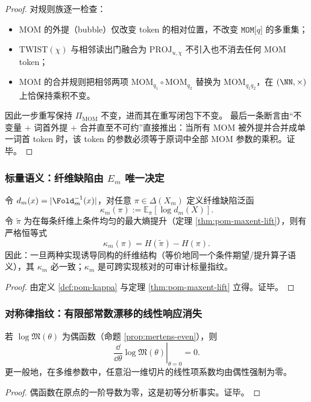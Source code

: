 \begin{proof}
对规则族逐一检查：
\begin{itemize}
  \item \(\mathrm{MOM}\) 的外提（bubble）仅改变 token 的相对位置，不改变 \(\texttt{MOM[}q\texttt{]}\) 的多重集；
  \item \(\mathrm{TWIST}(\chi)\) 与相邻读出门融合为 \(\mathrm{PROJ}_{u,\chi}\) 不引入也不消去任何 \(\mathrm{MOM}\) token；
  \item \(\mathrm{MOM}\) 的合并规则把相邻两项 \(\mathrm{MOM}_{q_1}\circ\mathrm{MOM}_{q_2}\) 替换为 \(\mathrm{MOM}_{q_1q_2}\)，在 \((\NN,\times)\) 上恰保持乘积不变。
\end{itemize}
因此一步重写保持 \(\Pi_{\mathrm{MOM}}\) 不变，进而其在重写闭包下不变。
最后一条断言由“不变量 + 词首外提 + 合并直至不可约”直接推出：当所有 \(\mathrm{MOM}\) 被外提并合并成单一词首 token 时，该 token 的参数必须等于原词中全部 MOM 参数的乘积。证毕。
\end{proof}

\subsubsection{标量语义：纤维缺陷由 \texorpdfstring{$E_m$}{Em} 唯一决定}
\begin{corollary}\label{cor:pom-kappa-derivable}
令 \(d_m(x)=|\Fold_m^{-1}(x)|\)，对任意 \(\pi\in\Delta(X_m)\) 定义纤维缺陷泛函
$$
\kappa_m(\pi):=\mathbb{E}_{\pi}[\log d_m(X)].
$$
令 \(\widetilde\pi\) 为在每条纤维上条件均匀的最大熵提升（定理 \ref{thm:pom-maxent-lift}），则有严格恒等式
$$
\kappa_m(\pi)=H(\widetilde\pi)-H(\pi).
$$
因此：一旦两种实现诱导同构的纤维结构（等价地同一个条件期望/提升算子语义），其 \(\kappa_m\) 必一致；\(\kappa_m\) 是可跨实现核对的可审计标量指纹。
\end{corollary}
\begin{proof}
由定义 \ref{def:pom-kappa} 与定理 \ref{thm:pom-maxent-lift} 立得。证毕。
\end{proof}

\subsubsection{对称律指纹：有限部常数漂移的线性响应消失}
\begin{corollary}[偶性 \texorpdfstring{$\Rightarrow$}{=>} 一阶项消失]\label{cor:pom-logm-linear-response-zero}
若 \(\log\mathfrak{M}(\theta)\) 为偶函数（命题 \ref{prop:mertens-even}），则
$$
\left.\frac{\dd}{\dd\theta}\log\mathfrak{M}(\theta)\right|_{\theta=0}=0.
$$
更一般地，在多维参数中，任意沿一维切片的线性项系数均由偶性强制为零。
\end{corollary}
\begin{proof}
偶函数在原点的一阶导数为零，这是初等分析事实。证毕。
\end{proof}

